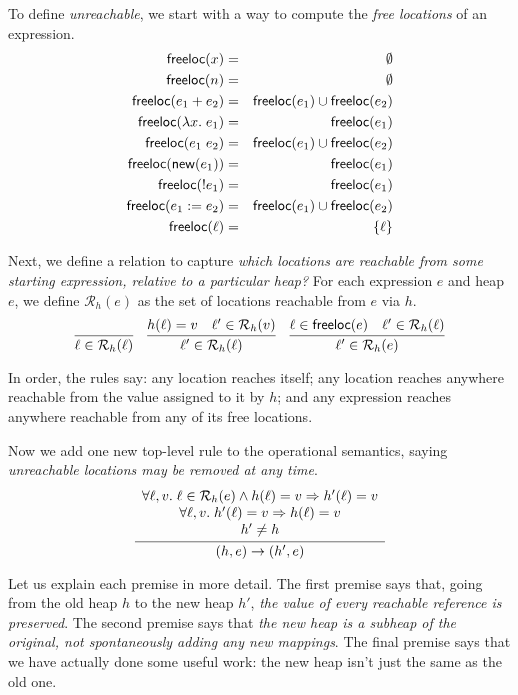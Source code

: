 \documentclass{amsbook}
\theoremstyle{definition}
\theoremstyle{remark}
\numberwithin{section}{chapter}
\numberwithin{equation}{chapter}
\begin{document}
To define \emph{unreachable}, we start with a way to compute the \emph{free locations} of an expression.
\begin{eqnarray*}
  \mathsf{freeloc}(x) &=& \emptyset \\
  \mathsf{freeloc}(n) &=& \emptyset \\
  \mathsf{freeloc}(e_1 + e_2) &=& \mathsf{freeloc}(e_1) \cup \mathsf{freeloc}(e_2) \\
  \mathsf{freeloc}(\lambda x. \; e_1) &=& \mathsf{freeloc}(e_1) \\
  \mathsf{freeloc}(e_1 \; e_2) &=& \mathsf{freeloc}(e_1) \cup \mathsf{freeloc}(e_2) \\
  \mathsf{freeloc}(\mathsf{new}(e_1)) &=& \mathsf{freeloc}(e_1) \\
  \mathsf{freeloc}(!e_1) &=& \mathsf{freeloc}(e_1) \\
  \mathsf{freeloc}(e_1 := e_2) &=& \mathsf{freeloc}(e_1) \cup \mathsf{freeloc}(e_2) \\
  \mathsf{freeloc}(\ell) &=& \{\ell\}
\end{eqnarray*}

\newcommand{\reach}[2]{\mathcal R_{#1}(#2)}

Next, we define a relation to capture \emph{which locations are reachable from some starting expression, relative to a particular heap?}
For each expression $e$ and heap $e$, we define $\reach{h}{e}$ as the set of locations reachable from $e$ via $h$.
$$\infer{\ell \in \reach{h}{\ell}}{}
\quad \infer{\ell' \in \reach{h}{\ell}}{
  \msel{h}{\ell} = v
  & \ell' \in \reach{h}{v}
}
\quad \infer{\ell' \in \reach{h}{e}}{
  \ell \in \freeloc{e}
  & \ell' \in \reach{h}{\ell}
}$$

In order, the rules say: any location reaches itself; any location reaches anywhere reachable from the value assigned to it by $h$; and any expression reaches anywhere reachable from any of its free locations.

Now we add one new top-level rule to the operational semantics, saying \emph{unreachable locations may be removed at any time}.
$$\infer{\smallstep{(h, e)}{(h', e)}}{
  \begin{array}{c}
    \forall \ell, v. \; \ell \in \reach{h}{e} \land \msel{h}{\ell} = v \Rightarrow \msel{h'}{\ell} = v \\
    \forall \ell, v. \; \msel{h'}{\ell} = v \Rightarrow \msel{h}{\ell} = v \\
    h' \neq h
  \end{array}
}$$

Let us explain each premise in more detail.
The first premise says that, going from the old heap $h$ to the new heap $h'$, \emph{the value of every reachable reference is preserved}.
The second premise says that \emph{the new heap is a subheap of the original, not spontaneously adding any new mappings}.
The final premise says that we have actually done some useful work: the new heap isn't just the same as the old one.
\end{document}
